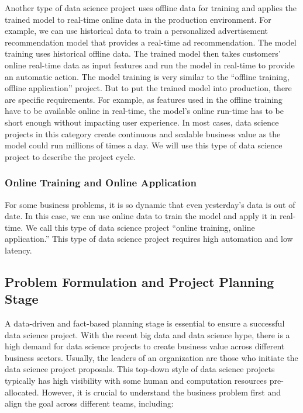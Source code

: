 \documentclass[12pt,]{krantz}
\begin{document}
Another type of data science project uses offline data for training and applies the trained model to real-time online data in the production environment. For example, we can use historical data to train a personalized advertisement recommendation model that provides a real-time ad recommendation. The model training uses historical offline data. The trained model then takes customers' online real-time data as input features and run the model in real-time to provide an automatic action. The model training is very similar to the ``offline training, offline application'' project. But to put the trained model into production, there are specific requirements. For example, as features used in the offline training have to be available online in real-time, the model's online run-time has to be short enough without impacting user experience. In most cases, data science projects in this category create continuous and scalable business value as the model could run millions of times a day. We will use this type of data science project to describe the project cycle.

\hypertarget{online-training-and-online-application}{%
\subsubsection{Online Training and Online Application}\label{online-training-and-online-application}}

For some business problems, it is so dynamic that even yesterday's data is out of date. In this case, we can use online data to train the model and apply it in real-time. We call this type of data science project ``online training, online application.'' This type of data science project requires high automation and low latency.

\hypertarget{problem-formulation-and-project-planning-stage}{%
\subsection{Problem Formulation and Project Planning Stage}\label{problem-formulation-and-project-planning-stage}}

A data-driven and fact-based planning stage is essential to ensure a successful data science project. With the recent big data and data science hype, there is a high demand for data science projects to create business value across different business sectors. Usually, the leaders of an organization are those who initiate the data science project proposals. This top-down style of data science projects typically has high visibility with some human and computation resources pre-allocated. However, it is crucial to understand the business problem first and align the goal across different teams, including:
\end{document}
